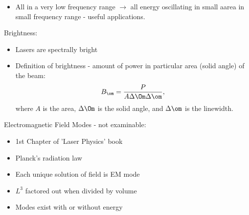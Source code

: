 \documentclass[a4paper, 11pt, normalem]{report}
\begin{document}
\begin{figure}[H]
    \centering
\end{figure}
\begin{itemize}
    \item All in a very low frequency range $\to$ all energy oscillating in small aarea in small frequency range - useful applications. 
\end{itemize}
Brightness:
\begin{itemize}
    \item Lasers are spectrally bright
    \item Definition of brightness - amount of power in particular area (solid angle) of the beam:
        \begin{equation}
            B_\om = \frac{P}{A\Delta\Om\Delta\om},
        \end{equation}
        where $A$ is the area, $\Delta\Om$ is the solid angle, and $\Delta\om$ is the linewidth. 
\end{itemize}
Electromagnetic Field Modes - not examinable:
\begin{itemize}
    \item 1st Chapter of 'Laser Physics' book
    \item Planck's radiation law
    \item Each unique solution of field is EM mode
    \item $L^3$ factored out when divided by volume
    \item Modes exist with or without energy
\end{itemize}
\end{document}

